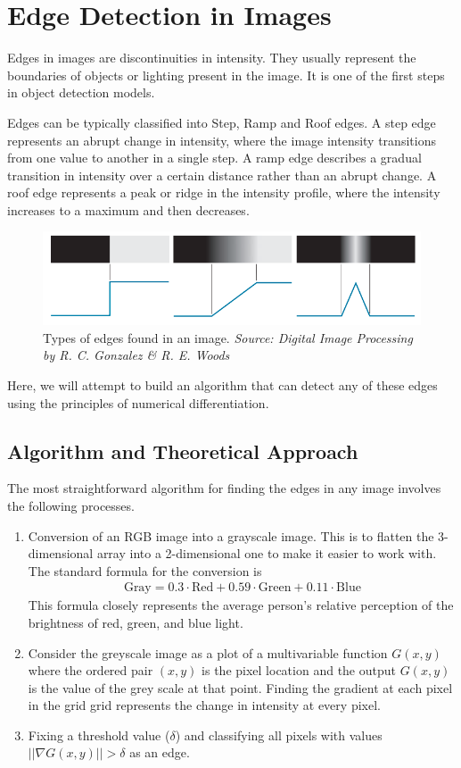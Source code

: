 \newpage
\section{Edge Detection in Images} 
Edges in images are discontinuities in intensity. They usually represent the boundaries of objects or lighting present in the image.
It is one of the first steps in object detection models.

Edges can be typically classified into Step, Ramp and Roof edges. A step edge represents an abrupt change in intensity, where the image intensity transitions from one value to another in a single step. A ramp edge describes a gradual transition in intensity over a certain distance rather than an abrupt change. A roof edge represents a peak or ridge in the intensity profile, where the intensity increases to a maximum and then decreases.

\begin{figure}[H]
    \centering
    \includegraphics[width=0.5\linewidth]{Figures/1/edges.png}
    \caption{Types of edges found in an image. \textit{Source: Digital Image Processing by R. C. Gonzalez \& R. E. Woods}}
\end{figure}

Here, we will attempt to build an algorithm that can detect any of these edges using the principles of numerical differentiation.

\subsection{Algorithm and Theoretical Approach}
The most straightforward algorithm for finding the edges in any image involves the following processes.

\begin{enumerate}
    \item Conversion of an RGB image into a grayscale image. This is to flatten the 3-dimensional array into a 2-dimensional one to make it easier to work with. The standard formula for the conversion is
    \begin{align}
        \text{Gray} = 0.3\cdot\text{Red} + 0.59\cdot\text{Green} + 0.11\cdot\text{Blue}
    \end{align}
    This formula closely represents the average person's relative perception of the brightness of red, green, and blue light.
    \item Consider the greyscale image as a plot of a multivariable function $G(x, y)$ where the ordered pair $(x, y)$ is the pixel location and the output $G(x, y)$ is the value of the grey scale at that point. Finding the gradient at each pixel in the grid grid represents the change in intensity at every pixel.
    \item Fixing a threshold value ($\delta$) and classifying all pixels with values $||\nabla G(x,y)||>\delta$ as an edge.
\end{enumerate}

